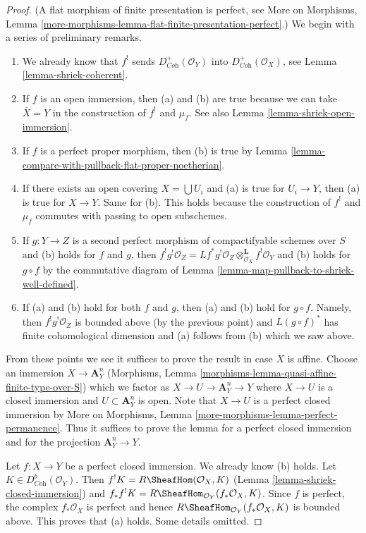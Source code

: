\begin{proof}
(A flat morphism of finite presentation is perfect, see
More on Morphisms, Lemma
\ref{more-morphisms-lemma-flat-finite-presentation-perfect}.)
We begin with a series of preliminary remarks.
\begin{enumerate}
\item We already know that $f^!$ sends $D_{\textit{Coh}}^+(\mathcal{O}_Y)$
into $D_{\textit{Coh}}^+(\mathcal{O}_X)$, see
Lemma \ref{lemma-shriek-coherent}.
\item If $f$ is an open immersion, then (a) and (b) are true because
we can take $\overline{X} = Y$ in the construction of $f^!$ and $\mu_f$.
See also Lemma \ref{lemma-shriek-open-immersion}.
\item If $f$ is a perfect proper morphism, then (b) is true by
Lemma \ref{lemma-compare-with-pullback-flat-proper-noetherian}.
\item If there exists an open covering $X = \bigcup U_i$ and (a) is
true for $U_i \to Y$, then (a) is true for $X \to Y$. Same for (b).
This holds because the construction of $f^!$ and $\mu_f$ commutes
with passing to open subschemes.
\item If $g : Y \to Z$ is a second perfect morphism of compactifyable
schemes over $S$ and (b) holds for $f$ and $g$, then
$f^!g^!\mathcal{O}_Z =
Lf^*g^!\mathcal{O}_Z \otimes_{\mathcal{O}_X}^\mathbf{L} f^!\mathcal{O}_Y$
and (b) holds for $g \circ f$ by the commutative diagram
of Lemma \ref{lemma-map-pullback-to-shriek-well-defined}.
\item If (a) and (b) hold for both $f$ and $g$, then
(a) and (b) hold for $g \circ f$. Namely, then $f^!g^!\mathcal{O}_Z$
is bounded above (by the previous point) and $L(g \circ f)^*$ has finite
cohomological dimension and (a) follows from (b) which we saw above.
\end{enumerate}
From these points we see it suffices to prove the result in case $X$ is affine.
Choose an immersion $X \to \mathbf{A}^n_Y$
(Morphisms, Lemma \ref{morphisms-lemma-quasi-affine-finite-type-over-S})
which we factor as $X \to U \to \mathbf{A}^n_Y \to Y$ where $X \to U$
is a closed immersion and $U \subset \mathbf{A}^n_Y$ is open.
Note that $X \to U$ is a perfect closed immersion by
More on Morphisms, Lemma \ref{more-morphisms-lemma-perfect-permanence}.
Thus it suffices to prove the lemma for a perfect closed immersion
and for the projection $\mathbf{A}^n_Y \to Y$.

\medskip\noindent
Let $f : X \to Y$ be a perfect closed immersion. We already know (b) holds.
Let $K \in D^b_{\textit{Coh}}(\mathcal{O}_Y)$.
Then $f^!K = R\SheafHom(\mathcal{O}_X, K)$
(Lemma \ref{lemma-shriek-closed-immersion})
and $f_*f^!K = R\SheafHom_{\mathcal{O}_Y}(f_*\mathcal{O}_X, K)$.
Since $f$ is perfect, the complex $f_*\mathcal{O}_X$ is perfect
and hence $R\SheafHom_{\mathcal{O}_Y}(f_*\mathcal{O}_X, K)$ is bounded above.
This proves that (a) holds. Some details omitted.


\end{proof}

